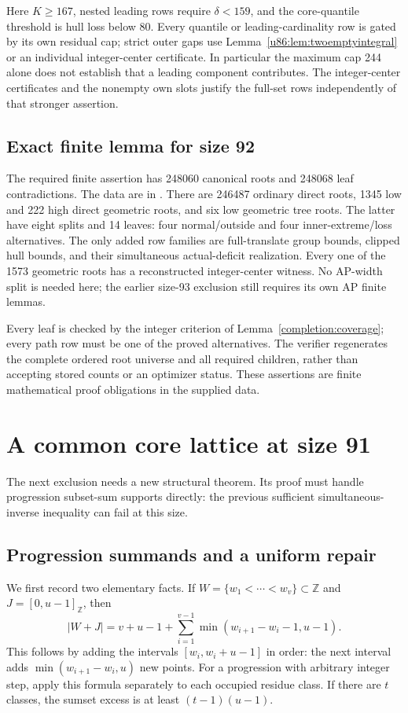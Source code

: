 \documentclass[11pt,a4paper]{article}
\theoremstyle{remark}
\newcommand{\Z}{\mathbb Z}
\begin{document}
Here $K\ge167$, nested leading rows require $\delta<159$, and the
core-quantile threshold is hull loss below 80. Every quantile or leading-cardinality row is gated by its
own residual cap; strict outer gaps use Lemma~\ref{u86:lem:twoemptyintegral}
or an individual integer-center certificate. In particular the maximum cap 244 alone does not
establish that a leading component contributes. The integer-center
certificates and the nonempty own slots justify the full-set rows
independently of that stronger assertion.


\subsection{Exact finite lemma for size 92}
\label{u86:finite:92}
The required finite assertion has 248060 canonical roots and 248068
leaf contradictions. The data are in .
There are 246487 ordinary direct roots, 1345 low and 222 high direct
geometric roots, and six low geometric tree roots. The latter have eight
splits and 14 leaves: four normal/outside and four inner-extreme/loss
alternatives. The only added row families are full-translate group
bounds, clipped hull bounds, and their simultaneous actual-deficit
realization. Every one of the 1573 geometric roots has a reconstructed
integer-center witness. No AP-width split is needed here; the earlier
size-93 exclusion still requires its own AP finite lemmas.

Every leaf is checked by the integer criterion of
Lemma~\ref{completion:coverage}; every path row must be one of the
proved alternatives. The verifier  regenerates
the complete ordered root universe and all required children, rather than
accepting stored counts or an optimizer status. These assertions are finite
mathematical proof obligations in the supplied data.



\section{A common core lattice at size 91}\label{u86:sec:lattice91}
The next exclusion needs a new structural theorem. Its proof must handle
progression subset-sum supports directly: the previous sufficient
simultaneous-inverse inequality can fail at this size.

\subsection{Progression summands and a uniform repair}
We first record two elementary facts. If $W=\{w_1<\cdots<w_v\}\subset\Z$
and $J=[0,u-1]_{\Z}$, then
\begin{equation}\label{u86:eq:APgaps}
 |W+J|=v+u-1+\sum_{i=1}^{v-1}\min(w_{i+1}-w_i-1,u-1).
\end{equation}
This follows by adding the intervals $[w_i,w_i+u-1]$ in order: the
next interval adds $\min(w_{i+1}-w_i,u)$ new points. For a progression
with arbitrary integer step, apply this formula separately to each
occupied residue class. If there are $t$ classes, the sumset excess is
at least $(t-1)(u-1)$.
\end{document}
